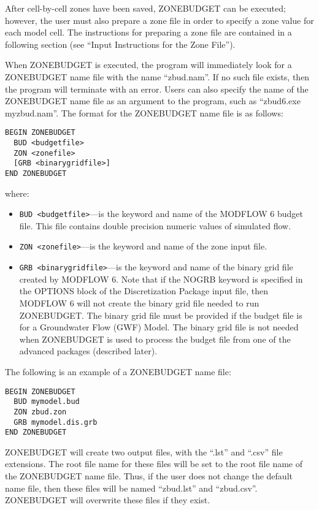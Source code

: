 \documentclass[11pt,twoside,twocolumn]{usgsreport}
\begin{document}
After cell-by-cell zones have been saved, ZONEBUDGET can be executed; however, the user must also prepare a zone file in order to specify a zone value for each model cell. The instructions for preparing a zone file are contained in a following section (see ``Input Instructions for the Zone File'').

When ZONEBUDGET is executed, the program will immediately look for a ZONEBUDGET name file with the name ``zbud.nam''.  If no such file exists, then the program will terminate with an error.  Users can also specify the name of the ZONEBUDGET name file as an argument to the program, such as ``zbud6.exe myzbud.nam''.  The format for the ZONEBUDGET name file is as follows:

\begin{verbatim}
BEGIN ZONEBUDGET
  BUD <budgetfile>
  ZON <zonefile>
  [GRB <binarygridfile>]
END ZONEBUDGET
\end{verbatim}

where:

\begin{itemize}
\item \texttt{BUD <budgetfile>}---is the keyword and name of the MODFLOW 6 budget file.  This file contains double precision numeric values of simulated flow.
\item \texttt{ZON <zonefile>}---is the keyword and name of the zone input file.
\item \texttt{GRB <binarygridfile>}---is the keyword and name of the binary grid file created by MODFLOW 6.  Note that if the NOGRB keyword is specified in the OPTIONS block of the Discretization Package input file, then MODFLOW 6 will not create the binary grid file needed to run ZONEBUDGET.  The binary grid file must be provided if the budget file is for a Groundwater Flow (GWF) Model.  The binary grid file is not needed when ZONEBUDGET is used to process the budget file from one of the advanced packages (described later).
\end{itemize}

The following is an example of a ZONEBUDGET name file:

\begin{verbatim}
BEGIN ZONEBUDGET
  BUD mymodel.bud
  ZON zbud.zon
  GRB mymodel.dis.grb
END ZONEBUDGET
\end{verbatim}

ZONEBUDGET will create two output files, with the ``.lst'' and ``.csv'' file extensions.  The root file name for these files will be set to the root file name of the ZONEBUDGET name file. Thus, if the user does not change the default name file, then these files will be named ``zbud.lst'' and ``zbud.csv''.  ZONEBUDGET will overwrite these files if they exist.
\end{document}
